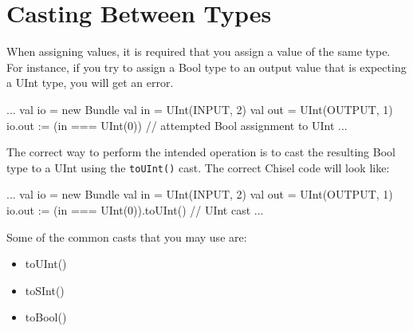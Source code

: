 \section{Casting Between Types}

When assigning values, it is required that you assign a value of the same type. For instance, if you try to assign a Bool type to an output value that is expecting a UInt type, you will get an error.

\begin{scala}
  ...
  val io  = new Bundle {
    val in  = UInt(INPUT, 2)
    val out = UInt(OUTPUT, 1)
  }
  io.out := (in === UInt(0)) // attempted Bool assignment to UInt
  ...
\end{scala}

The correct way to perform the intended operation is to cast the resulting Bool type to a UInt using the \verb+toUInt()+ cast. The correct Chisel code will look like:

\begin{scala}
  ...
  val io = new Bundle {
    val in  = UInt(INPUT, 2)
    val out = UInt(OUTPUT, 1)
  }
  io.out := (in === UInt(0)).toUInt() // UInt cast
  ...
\end{scala}

Some of the common casts that you may use are:

\begin{itemize}
\item toUInt()
\item toSInt()
\item toBool()
\end{itemize}
